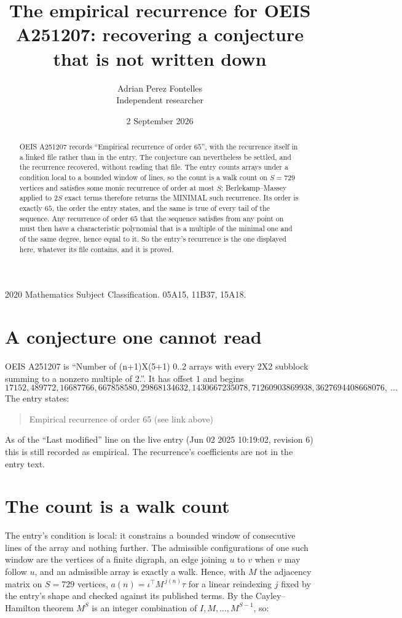 \documentclass[11pt,a4paper]{article}
\title{The empirical recurrence for OEIS A251207: recovering a conjecture that is not written down}
\author{Adrian Perez Fontelles\\ \small Independent researcher}
\date{2 September 2026}
\theoremstyle{plain}
\theoremstyle{definition}
\begin{document}
\maketitle

\begin{abstract}
OEIS A251207 records ``Empirical recurrence of order $65$'', with the recurrence itself in a
linked file rather than in the entry. The conjecture can nevertheless be settled, and the
recurrence recovered, without reading that file. The entry counts arrays under a condition
local to a bounded window of lines, so the count is a walk count on $S=729$ vertices and
satisfies some monic recurrence of order at most $S$; Berlekamp--Massey applied to $2S$ exact
terms therefore returns the MINIMAL such recurrence. Its order is exactly $65$, the order
the entry states, and the same is true of every tail of the sequence. Any recurrence of order
$65$ that the sequence satisfies from any point on must then have a characteristic
polynomial that is a multiple of the minimal one and of the same degree, hence equal to it. So
the entry's recurrence is the one displayed here, whatever its file contains, and it is
proved.
\end{abstract}

\noindent\small 2020 Mathematics Subject Classification. 05A15, 11B37, 15A18.\normalsize

\section{A conjecture one cannot read}

OEIS A251207 is ``Number of (n+1)X(5+1) 0..2 arrays with every 2X2 subblock summing to a nonzero multiple of 2.''. It has offset $1$ and begins
\[
17152, 489772, 16687766, 667858580, 29868134632, 1430667235078, 71260903869938, 3627694408668076,\ \dots
\]
The entry states:
\begin{quote}
Empirical recurrence of order 65 (see link above)
\end{quote}
As of the ``Last modified'' line on the live entry (Jun 02 2025 10:19:02, revision 6) this is still
recorded as empirical. The recurrence's coefficients are not in the entry text.

\section{The count is a walk count}

The entry's condition is local: it constrains a bounded window of consecutive lines of the
array and nothing further. The admissible configurations of one such window are the vertices
of a finite digraph, an edge joining $u$ to $v$ when $v$ may follow $u$, and an admissible
array is exactly a walk. Hence, with $M$ the adjacency matrix on $S=729$ vertices,
$a(n)=\iota^{\!\top}M^{\,j(n)}\tau$ for a linear reindexing $j$ fixed by the entry's shape
and checked against its published terms. By the Cayley--Hamilton theorem $M^{S}$ is an
integer combination of $I,M,\dots,M^{S-1}$, so:
\end{document}
